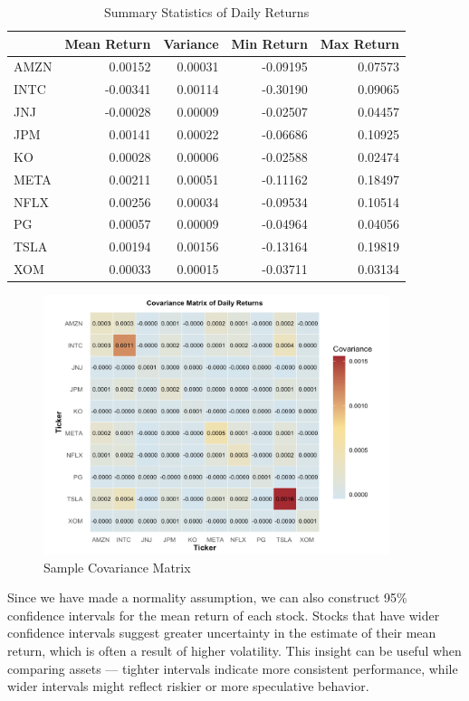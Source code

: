 \documentclass[11pt]{article}
\begin{document}
\begin{table}[htbp]
\centering
\begin{tabular}{lrrrr}
\hline
 & Mean Return & Variance & Min Return & Max Return \\
\hline
AMZN & 0.00152 & 0.00031 & -0.09195 & 0.07573 \\
INTC & -0.00341 & 0.00114 & -0.30190 & 0.09065 \\
JNJ & -0.00028 & 0.00009 & -0.02507 & 0.04457 \\
JPM & 0.00141 & 0.00022 & -0.06686 & 0.10925 \\
KO & 0.00028 & 0.00006 & -0.02588 & 0.02474 \\
META & 0.00211 & 0.00051 & -0.11162 & 0.18497 \\
NFLX & 0.00256 & 0.00034 & -0.09534 & 0.10514 \\
PG & 0.00057 & 0.00009 & -0.04964 & 0.04056 \\
TSLA & 0.00194 & 0.00156 & -0.13164 & 0.19819 \\
XOM & 0.00033 & 0.00015 & -0.03711 & 0.03134 \\
\hline
\end{tabular}
\caption{Summary Statistics of Daily Returns}
\label{tab:returns}
\end{table}

\begin{figure}[H]
    \centering
    \includegraphics[width=0.9\textwidth]{Plots_Gursimar/sample_covariance.png}
    \caption{Sample Covariance Matrix}
    \label{fig:rsample-covariance}
\end{figure}

Since we have made a normality assumption, we can also construct 95\% confidence intervals for the mean return of each stock. Stocks that have wider confidence intervals suggest greater uncertainty in the estimate of their mean return, which is often a result of higher volatility. This insight can be useful when comparing assets — tighter intervals indicate more consistent performance, while wider intervals might reflect riskier or more speculative behavior.
\end{document}
